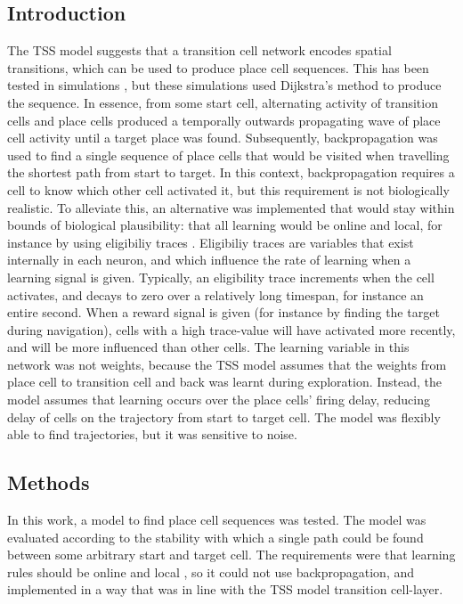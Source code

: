 \documentclass{article}
\begin{document}
    \subsection{Introduction}
    The TSS model suggests that a transition cell network encodes spatial transitions, which can be used to produce place cell sequences. This has been tested in simulations \parencite{Waniek2020}, but these simulations used Dijkstra's method to produce the sequence. In essence, from some start cell, alternating activity of transition cells and place cells produced a temporally outwards propagating wave of place cell activity until a target place was found. Subsequently, backpropagation was used to find a single sequence of place cells that would be visited when travelling the shortest path from start to target. In this context, backpropagation requires a cell to know which other cell activated it, but this requirement is not biologically realistic.
    To alleviate this, an alternative was implemented that would stay within bounds of biological plausibility: that all learning would be online and local, for instance by using eligibiliy traces \parencite{VanDerVeen2022}. Eligibiliy traces are variables that exist internally in each neuron, and which influence the rate of learning when a learning signal is given. Typically, an eligibility trace increments when the cell activates, and decays to zero over a relatively long timespan, for instance an entire second. When a reward signal is given (for instance by finding the target during navigation), cells with a high trace-value will have activated more recently, and will be more influenced than other cells.
    The learning variable in this network was not weights, because the TSS model assumes that the weights from place cell to transition cell and back was learnt during exploration. Instead, the model assumes that learning occurs over the place cells' firing delay, reducing delay of cells on the trajectory from start to target cell. The model was flexibly able to find trajectories, but it was sensitive to noise.

    \subsection{Methods}
    In this work, a model to find place cell sequences was tested. The model was evaluated according to the stability with which a single path could be found between some arbitrary start and target cell. The requirements were that learning rules should be online and local \parencite{VanDerVeen2022}, so it could not use backpropagation, and implemented in a way that was in line with the TSS model transition cell-layer.
\end{document}
